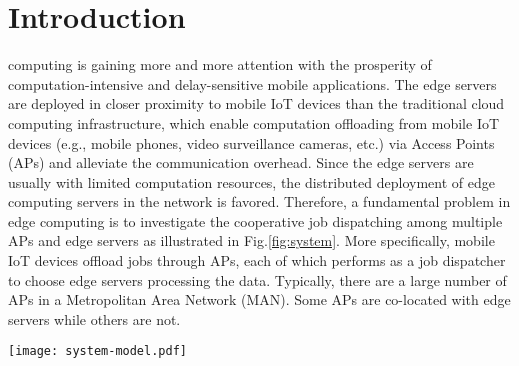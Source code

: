 \section{Introduction}
\label{sec:introduction}
 computing is gaining more and more attention with the prosperity of computation-intensive and delay-sensitive mobile applications. %
The edge servers are deployed in closer proximity to mobile IoT devices than the traditional cloud computing infrastructure, which enable computation offloading from mobile IoT devices (e.g., mobile phones, video surveillance cameras, etc.) via Access Points (APs) and alleviate the communication overhead. 
Since the edge servers are usually with limited computation resources, the distributed deployment of edge computing servers in the network is favored.
Therefore, a fundamental problem in edge computing is to investigate the cooperative job dispatching among multiple APs and edge servers as illustrated in Fig.\ref{fig:system}.
More specifically, mobile IoT devices offload jobs through APs, each of which performs as a job dispatcher to choose edge servers processing the data. Typically, there are a large number of APs in a Metropolitan Area Network (MAN). Some APs are co-located with edge servers while others are not. %

\begin{figure*}[htp!]
    \centering
    \texttt{[image: system-model.pdf]}
    \caption{The illustration of system model.}
    \label{fig:system}
\end{figure*}


